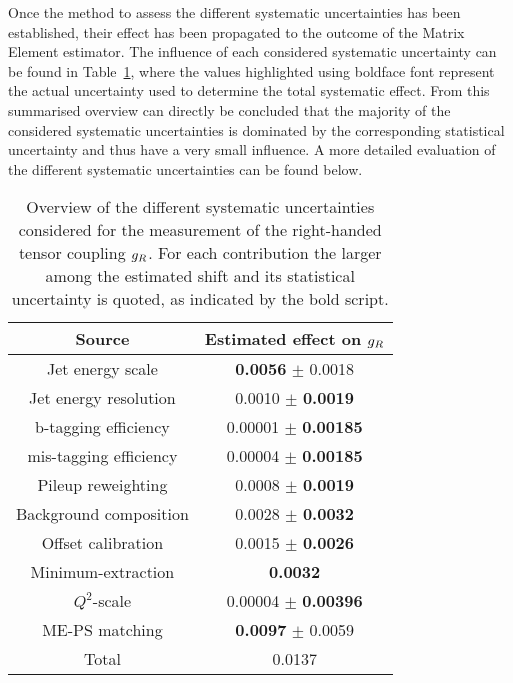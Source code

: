 Once the method to assess the different systematic uncertainties has been established, their effect has been propagated to the outcome of the Matrix Element estimator.
The influence of each considered systematic uncertainty can be found in Table~\ref{table::SystValues}, where the values highlighted using boldface font represent the actual uncertainty used to determine the total systematic effect.
From this summarised overview can directly be concluded that the majority of the considered systematic uncertainties is dominated by the corresponding statistical uncertainty and thus have a very small
influence.
A more detailed evaluation of the different systematic uncertainties can be found below.
\\
\begin{table}[h!t]
 \centering
 \caption{Overview of the different systematic uncertainties considered for the measurement of the right-handed tensor coupling $g_{R}$. For each contribution the larger among the estimated shift and its statistical uncertainty is quoted, as indicated by the bold script.} \label{table::SystValues}
 \renewcommand{\arraystretch}{1.2}
 \begin{tabular}{|c|c|}
  \hline
  Source 				& Estimated effect on $g_{R}$ 		\\
  \hline
  Jet energy scale 	 		& \textbf{0.0056} $\pm$ 0.0018 		\\
  Jet energy resolution 		& 0.0010 $\pm$  \textbf{0.0019} 	\\
  b-tagging efficiency 			& 0.00001 $\pm$ \textbf{0.00185} 	\\
  mis-tagging efficiency  		& 0.00004 $\pm$ \textbf{0.00185} 	\\
  Pileup reweighting  			& 0.0008 $\pm$ \textbf{0.0019} 		\\
  Background composition 	 	& 0.0028 $\pm$ \textbf{0.0032} 		\\
  Offset calibration			& 0.0015 $\pm$ \textbf{0.0026} 		\\
  Minimum-extraction 			& \textbf{0.0032} 			\\
  $Q^{2}$-scale				& 0.00004 $\pm$ \textbf{0.00396}	\\
   ME-PS matching 			& \textbf{0.0097} $\pm$ 0.0059		\\
 \hline
  Total 				& 0.0137				\\
  \hline
 \end{tabular}
\end{table}

